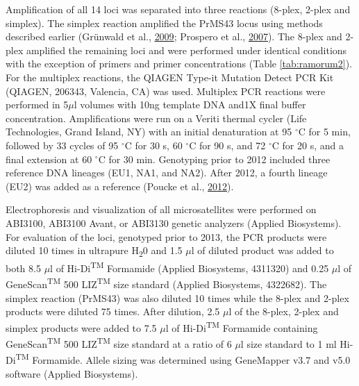 \documentclass[double,11pt]{beavtex}
\begin{document}
  Amplification of all 14 loci was separated into three reactions (8-plex,
  2-plex and simplex). The simplex reaction amplified the PrMS43 locus
  using methods described earlier (Grünwald et al.,
  \protect\hyperlink{ref-grunwald2009standardizing}{2009}; Prospero et
  al., \protect\hyperlink{ref-prospero2007population}{2007}). The 8-plex
  and 2-plex amplified the remaining loci and were performed under
  identical conditions with the exception of primers and primer
  concentrations (Table \ref{tab:ramorum2}). For the multiplex reactions,
  the QIAGEN Type-it Mutation Detect PCR Kit (QIAGEN, 206343, Valencia,
  CA) was used. Multiplex PCR reactions were performed in 5\(\mu\)l
  volumes with 10ng template DNA and1X final buffer concentration.
  Amplifications were run on a Veriti thermal cycler (Life Technologies,
  Grand Island, NY) with an initial denaturation at 95 \(^{\circ}\)C for 5
  min, followed by 33 cycles of 95 \(^{\circ}\)C for 30 s, 60
  \(^{\circ}\)C for 90 s, and 72 \(^{\circ}\)C for 20 s, and a final
  extension at 60 \(^{\circ}\)C for 30 min. Genotyping prior to 2012
  included three reference DNA lineages (EU1, NA1, and NA2). After 2012, a
  fourth lineage (EU2) was added as a reference (Poucke et al.,
  \protect\hyperlink{ref-vanpoucke2012discovery}{2012}).
  
  Electrophoresis and visualization of all microsatellites were performed
  on ABI3100, ABI3100 Avant, or ABI3130 genetic analyzers (Applied
  Biosystems). For evaluation of the loci, genotyped prior to 2013, the
  PCR products were diluted 10 times in ultrapure H\textsubscript{2}0 and
  1.5 \(\mu\)l of diluted product was added to both 8.5 \(\mu\)l of
  Hi-Di\textsuperscript{TM} Formamide (Applied Biosystems, 4311320) and
  0.25 \(\mu\)l of GeneScan\textsuperscript{TM} 500
  LIZ\textsuperscript{TM} size standard (Applied Biosystems, 4322682). The
  simplex reaction (PrMS43) was also diluted 10 times while the 8-plex and
  2-plex products were diluted 75 times. After dilution, 2.5 \(\mu\)l of
  the 8-plex, 2-plex and simplex products were added to 7.5 \(\mu\)l of
  Hi-Di\textsuperscript{TM} Formamide containing
  GeneScan\textsuperscript{TM} 500 LIZ\textsuperscript{TM} size standard
  at a ratio of 6 \(\mu\)l size standard to 1 ml Hi-Di\textsuperscript{TM}
  Formamide. Allele sizing was determined using
  GeneMapper\textregistered{} v3.7 and v5.0 software (Applied Biosystems).
  
  \setcounter{figure}{0} \setcounter{table}{0}
  \renewcommand{\figurename}{Supplementary Figure}
  \renewcommand{\tablename}{Supplementary Table}
  \renewcommand{\thefigure}{\arabic{chapter}.S\arabic{figure}}
  \renewcommand{\thetable}{\arabic{chapter}.S\arabic{table}}
  
\end{document}

